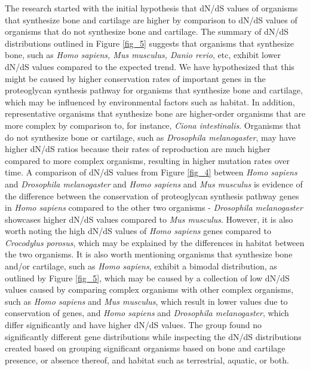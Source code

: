 \documentclass{article}
\begin{document}
The research started with the initial hypothesis that dN/dS values of organisms that synthesize bone and cartilage are higher by comparison to dN/dS values of organisms that do not synthesize bone and cartilage. The summary of dN/dS distributions outlined in Figure \ref{fig_5} suggests that organisms that synthesize bone, such as \textit{Homo sapiens, Mus musculus, Danio rerio}, etc, exhibit lower dN/dS values compared to the expected trend. We have hypothesized that this might be caused by higher conservation rates of important genes in the proteoglycan synthesis pathway for organisms that synthesize bone and cartilage, which may be influenced by environmental factors such as habitat. In addition, representative organisms that synthesize bone are higher-order organisms that are more complex by comparison to, for instance, \textit{Ciona intestinalis}. Organisms that do not synthesize bone or cartilage, such as \textit{Drosophila melanogaster}, may have higher dN/dS ratios because their rates of reproduction are much higher compared to more complex organisms, resulting in higher mutation rates over time. A comparison of dN/dS values from Figure \ref{fig_4} between \textit{Homo sapiens} and \textit{Drosophila melanogaster} and \textit{Homo sapiens} and \textit{Mus musculus} is evidence of the difference between the conservation of proteoglycan synthesis pathway genes in \textit{Homo sapiens} compared to the other two organisms - \textit{Drosophila melanogaster} showcases higher dN/dS values compared to \textit{Mus musculus}. However, it is also worth noting the high dN/dS values of \textit{Homo sapiens} genes compared to \textit{Crocodylus porosus}, which may be explained by the differences in habitat between the two organisms. It is also worth mentioning organisms that synthesize bone and/or cartilage, such as \textit{Homo sapiens}, exhibit a bimodal distribution, as outlined by Figure \ref{fig_5}, which may be caused by a collection of low dN/dS values caused by comparing complex organisms with other complex organisms, such as \textit{Homo sapiens} and \textit{Mus musculus}, which result in lower values due to conservation of genes, and \textit{Homo sapiens} and \textit{Drosophila melanogaster}, which differ significantly and have higher dN/dS values. The group found no significantly different gene distributions while inspecting the dN/dS distributions created based on grouping significant organisms based on bone and cartilage presence, or absence thereof, and habitat such as terrestrial, aquatic, or both.
\end{document}
